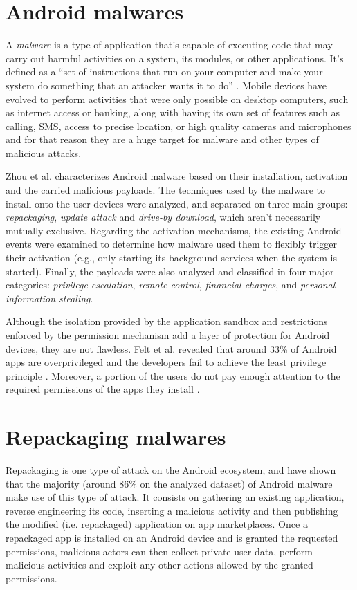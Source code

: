 \section{Android malwares}

A \textit{malware} is a type of application that's capable of executing code that may carry out harmful activities on a system, its modules, or other applications. It's defined as a ``set of instructions that run on your computer and make your system do something that an attacker wants it to do'' \cite{skoudis_malware_2003}. Mobile devices have evolved to perform activities that were only possible on desktop computers, such as internet access or banking, along with having its own set of features such as calling, SMS, access to precise location, or high quality cameras and microphones and for that reason they are a huge target for malware and other types of malicious attacks.

Zhou et al. \cite{zhou_dissecting_2012} characterizes Android malware based on their installation, activation and the carried malicious payloads. The techniques used by the malware to install onto the user devices were analyzed, and separated on three main groups: \textit{repackaging}, \textit{update attack} and \textit{drive-by download}, which aren't necessarily mutually exclusive. Regarding the activation mechanisms, the existing Android events were examined to determine how malware used them to flexibly trigger their activation (e.g., only starting its background services when the system is started). Finally, the payloads were also analyzed and classified in four major categories: \textit{privilege escalation}, \textit{remote control}, \textit{financial
charges}, and \textit{personal information stealing}.

Although the isolation provided by the application sandbox and restrictions enforced by the permission mechanism add a layer of protection for Android devices, they are not flawless. Felt et al. revealed that around 33\% of Android apps are overprivileged and the developers fail to achieve the least privilege principle \cite{felt_android_2011}. Moreover, a portion of the users do not pay enough attention to the required permissions of the apps they install \cite{felt_android_2012}.

\section{Repackaging malwares}

Repackaging is one type of attack on the Android ecosystem, and \cite{zhou_dissecting_2012} have shown that the majority (around 86\% on the analyzed dataset) of Android malware make use of this type of attack. It consists on gathering an existing application, reverse engineering its code, inserting a malicious activity and then publishing the modified (i.e. repackaged) application on app marketplaces. Once a repackaged app is installed on an Android device and is granted the requested permissions, malicious actors can then collect private user data, perform malicious activities and exploit any other actions allowed by the granted permissions. 

